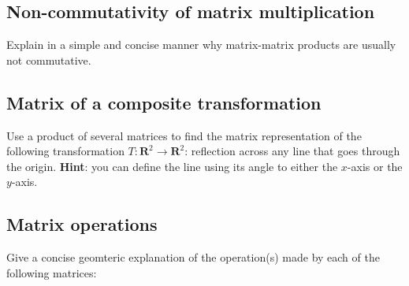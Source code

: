 \documentclass{article}
\begin{document}
\subsection{Non-commutativity of matrix multiplication}
Explain in a simple and concise manner why matrix-matrix products are
usually not commutative.

\subsection{Matrix of a composite transformation}
Use a product of several matrices to find the matrix representation of the following transformation $T:\mathbf{R}^{2}\to\mathbf{R}^{2}$: reflection across any line that goes through the origin. \textbf{Hint}: you can define the line using its angle to either the $x$-axis or the $y$-axis.

\subsection{Matrix operations}
Give a concise geomteric explanation of the operation(s) made by each
of the following matrices:
\end{document}
